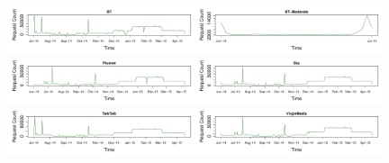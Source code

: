 \documentclass{bmcart}
\begin{document}
\begin{figure}[h!]
\caption{}
\includegraphics[width=0.49\textwidth]{imgs/BT-ts-requests.pdf}\includegraphics[width=0.49\textwidth]{imgs/BT-Moderate-ts-requests.pdf}
\includegraphics[width=0.49\textwidth]{imgs/Plusnet-ts-requests.pdf}\includegraphics[width=0.49\textwidth]{imgs/Sky-ts-requests.pdf}
\includegraphics[width=0.49\textwidth]{imgs/TalkTalk-ts-requests.pdf}\includegraphics[width=0.49\textwidth]{imgs/VirginMedia-ts-requests.pdf}
\label{fig:broadband-requests}
\end{figure}
\end{document}
